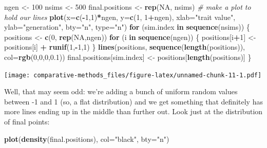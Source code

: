\documentclass[]{article}
\newenvironment{Shaded}{\begin{snugshade}}{\end{snugshade}}
\newcommand{\CommentTok}[1]{\textcolor[rgb]{0.56,0.35,0.01}{\textit{#1}}}
\newcommand{\ControlFlowTok}[1]{\textcolor[rgb]{0.13,0.29,0.53}{\textbf{#1}}}
\newcommand{\DataTypeTok}[1]{\textcolor[rgb]{0.13,0.29,0.53}{#1}}
\newcommand{\DecValTok}[1]{\textcolor[rgb]{0.00,0.00,0.81}{#1}}
\newcommand{\FloatTok}[1]{\textcolor[rgb]{0.00,0.00,0.81}{#1}}
\newcommand{\KeywordTok}[1]{\textcolor[rgb]{0.13,0.29,0.53}{\textbf{#1}}}
\newcommand{\NormalTok}[1]{#1}
\newcommand{\OperatorTok}[1]{\textcolor[rgb]{0.81,0.36,0.00}{\textbf{#1}}}
\newcommand{\OtherTok}[1]{\textcolor[rgb]{0.56,0.35,0.01}{#1}}
\newcommand{\StringTok}[1]{\textcolor[rgb]{0.31,0.60,0.02}{#1}}
\begin{document}
\begin{Shaded}
\begin{Highlighting}[]
\NormalTok{ngen <-}\StringTok{ }\DecValTok{100}
\NormalTok{nsims <-}\StringTok{ }\DecValTok{500}
\NormalTok{final.positions <-}\StringTok{ }\KeywordTok{rep}\NormalTok{(}\OtherTok{NA}\NormalTok{, nsims)}
\CommentTok{# make a plot to hold our lines}
\KeywordTok{plot}\NormalTok{(}\DataTypeTok{x=}\KeywordTok{c}\NormalTok{(}\OperatorTok{-}\DecValTok{1}\NormalTok{,}\DecValTok{1}\NormalTok{)}\OperatorTok{*}\NormalTok{ngen, }\DataTypeTok{y=}\KeywordTok{c}\NormalTok{(}\DecValTok{1}\NormalTok{, }\DecValTok{1}\OperatorTok{+}\NormalTok{ngen), }\DataTypeTok{xlab=}\StringTok{"trait value"}\NormalTok{, }\DataTypeTok{ylab=}\StringTok{"generation"}\NormalTok{, }\DataTypeTok{bty=}\StringTok{"n"}\NormalTok{, }\DataTypeTok{type=}\StringTok{"n"}\NormalTok{)}
\ControlFlowTok{for}\NormalTok{ (sim.index }\ControlFlowTok{in} \KeywordTok{sequence}\NormalTok{(nsims)) \{}
\NormalTok{  positions <-}\StringTok{ }\KeywordTok{c}\NormalTok{(}\DecValTok{0}\NormalTok{, }\KeywordTok{rep}\NormalTok{(}\OtherTok{NA}\NormalTok{,ngen))}
  \ControlFlowTok{for}\NormalTok{ (i }\ControlFlowTok{in} \KeywordTok{sequence}\NormalTok{(ngen)) \{}
\NormalTok{    positions[i}\OperatorTok{+}\DecValTok{1}\NormalTok{] <-}\StringTok{ }\NormalTok{positions[i] }\OperatorTok{+}\StringTok{ }\KeywordTok{runif}\NormalTok{(}\DecValTok{1}\NormalTok{,}\OperatorTok{-}\DecValTok{1}\NormalTok{,}\DecValTok{1}\NormalTok{)}
\NormalTok{  \}}
  \KeywordTok{lines}\NormalTok{(positions, }\KeywordTok{sequence}\NormalTok{(}\KeywordTok{length}\NormalTok{(positions)), }\DataTypeTok{col=}\KeywordTok{rgb}\NormalTok{(}\DecValTok{0}\NormalTok{,}\DecValTok{0}\NormalTok{,}\DecValTok{0}\NormalTok{,}\FloatTok{0.1}\NormalTok{))}
\NormalTok{  final.positions[sim.index] <-}\StringTok{ }\NormalTok{positions[}\KeywordTok{length}\NormalTok{(positions)]}
\NormalTok{\}}
\end{Highlighting}
\end{Shaded}

\texttt{[image: comparative-methods\_files/figure-latex/unnamed-chunk-11-1.pdf]}

Well, that may seem odd: we're adding a bunch of uniform random values between -1 and 1 (so, a flat distribution) and we get something that definitely has more lines ending up in the middle than further out. Look just at the distribution of final points:

\begin{Shaded}
\begin{Highlighting}[]
\KeywordTok{plot}\NormalTok{(}\KeywordTok{density}\NormalTok{(final.positions), }\DataTypeTok{col=}\StringTok{"black"}\NormalTok{, }\DataTypeTok{bty=}\StringTok{"n"}\NormalTok{)}
\end{Highlighting}
\end{Shaded}
\end{document}
